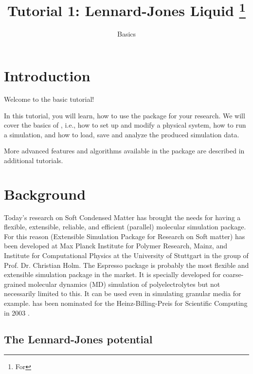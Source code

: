 \documentclass[
paper=a4,                       %
fontsize=11pt,                  %
twoside,                        %
footsepline,                    %
headsepline,                    %
headinclude=false,              %
footinclude=false,              %
pagesize,                       %
]{scrartcl}
\begin{document}
\esptitlehead

\title{Tutorial 1: Lennard-Jones Liquid%
\ifdefined\esversion%
\thanks{For \es \esversion}%
\fi%
}
\subtitle{\es Basics}
\maketitle
\tableofcontents

\section{Introduction}

Welcome to the basic \es{} tutorial!

In this tutorial, you will learn, how to use the \es{} package for your 
research. We will cover the basics of \es, i.e., how to set up and modify a 
physical system, how to run a simulation, and how to load, save and analyze
the produced simulation data.

More advanced features and algorithms available in the \es{} package are 
described in additional tutorials.


\section{Background}

Today's research on Soft Condensed Matter has brought the needs for having a 
flexible, extensible, reliable, and efficient (parallel) molecular simulation 
package. For this reason \es{} (Extensible Simulation Package for Research on 
Soft matter) \cite{esp_url} has been developed at Max Planck Institute for 
Polymer Research, Mainz, and Institute for Computational Physics at the University of Stuttgart in  the group of Prof. Dr. Christian Holm\cite{limbach2006ees,arnold13a}. The Espresso package is probably the most flexible and 
extensible simulation package in the market. It is specially developed for 
coarse-grained molecular dynamics (MD) simulation of polyelectrolytes but not 
necessarily limited to this. It can be used even in simulating granular media 
for example. \es{} has been nominated for the Heinz-Billing-Preis for 
Scientific Computing in 2003 \cite{arnold2003ees}.

\subsection{The Lennard-Jones potential}
\end{document}
